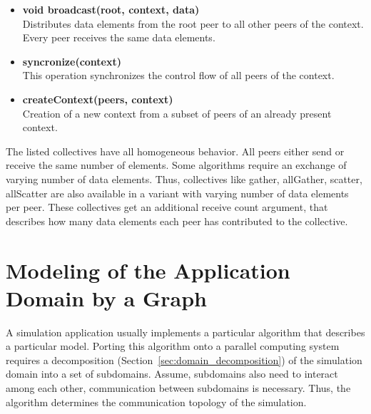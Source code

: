 \begin{itemize}
\item  \textbf{void broadcast(root, context, data)}\\
  Distributes data elements from the root peer to all other peers of
  the context. Every peer receives the same data elements.

\item  \textbf{syncronize(context)}\\
  This operation synchronizes the control flow of all peers of the
  context.

\item  \textbf{createContext(peers, context)}\\ 
  Creation of a new context from a subset of peers of an already
  present context.

\end{itemize}

The listed collectives have all homogeneous behavior. All peers either
send or receive the same number of elements.  Some algorithms require
an exchange of varying number of data elements. Thus, collectives like
gather, allGather, scatter, allScatter are also available in a variant
with varying number of data elements per peer. These collectives get
an additional receive count argument, that describes how many data
elements each peer has contributed to the collective.


\section{Modeling of the Application Domain by a Graph}
\label{sec:graph}
A simulation application usually implements a particular algorithm
that describes a particular model. Porting this algorithm onto a
parallel computing system requires a decomposition
(Section~\ref{sec:domain_decomposition}) of the simulation domain into
a set of subdomains.  Assume, subdomains also need to interact among
each other, communication between subdomains is necessary. Thus, the
algorithm determines the communication topology of the simulation.


